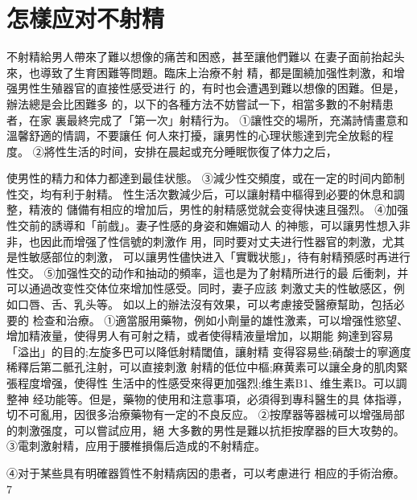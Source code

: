 \documentclass[12pt,UTF8]{ctexbook}
\begin{document}
\section{怎樣应对不射精}
不射精給男人帶來了難以想像的痛苦和困惑，甚至讓他們難以
在妻子面前抬起头來，也導致了生育困難等問題。臨床上治療不射
精，都是圍繞加强性刺激，和增强男性生殖器官的直接性感受进行
的，有时也会遭遇到難以想像的困難。但是，辦法總是会比困難多
的，以下的各種方法不妨嘗試一下，相當多數的不射精患者，在家
裏最終完成了「第一次」射精行为。
①讓性交的場所，充滿詩情畫意和溫馨舒適的情調，不要讓任
何人來打擾，讓男性的心理状態達到完全放鬆的程度。
②將性生活的时间，安排在晨起或充分睡眠恢復了体力之后，

使男性的精力和体力都達到最佳状態。
③減少性交頻度，或在一定的时间内節制性交，均有利于射精。
性生活次數減少后，可以讓射精中樞得到必要的休息和調整，精液的
儲備有相应的增加后，男性的射精感觉就会变得快速且强烈。
④加强性交前的誘導和「前戲」。妻子性感的身姿和嫵媚动人
的神態，可以讓男性想入非非，也因此而增强了性信號的刺激作
用，同时要对丈夫进行性器官的刺激，尤其是性敏感部位的刺激，
可以讓男性儘快进入「實戰状態」，待有射精預感时再进行性交。
⑤加强性交的动作和抽动的頻率，這也是为了射精所进行的最
后衝刺，并可以通過改变性交体位來增加性感受。同时，妻子应該
刺激丈夫的性敏感区，例如口唇、舌、乳头等。
如以上的辦法沒有效果，可以考慮接受醫療幫助，包括必要的
检查和治療。
①適當服用藥物，例如小劑量的雄性激素，可以增强性慾望、
增加精液量，使得男人有可射之精，或者使得精液量增加，以期能
夠達到容易「溢出」的目的;左旋多巴可以降低射精閾值，讓射精
变得容易些;硝酸士的寧適度稀釋后第二骶孔注射，可以直接刺激
射精的低位中樞;麻黄素可以讓全身的肌肉緊張程度增强，使得性
生活中的性感受來得更加强烈;维生素B1、维生素B。可以調整神
经功能等。但是，藥物的使用和注意事項，必須得到專科醫生的具
体指導，切不可亂用，因很多治療藥物有一定的不良反应。
②按摩器等器械可以增强局部的刺激强度，可以嘗試应用，絕
大多數的男性是難以抗拒按摩器的巨大攻勢的。
③電刺激射精，应用于腰椎損傷后造成的不射精症。

④对于某些具有明確器質性不射精病因的患者，可以考慮进行
相应的手術治療。
7
\end{document}
